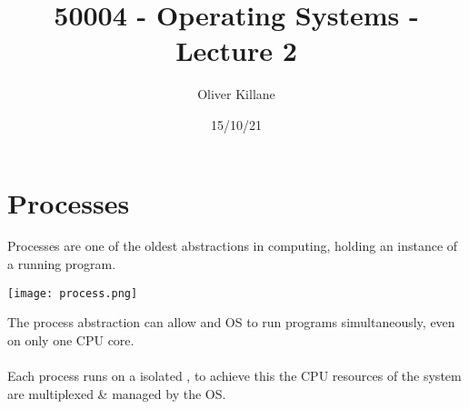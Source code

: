 \documentclass{report}
\title{50004 - Operating Systems - Lecture 2}
\author{Oliver Killane}
\date{15/10/21}
\begin{document}
    \maketitle

    \section*{Processes}
        Processes are one of the oldest abstractions in computing, holding an instance of a running program.
        \begin{center}
            \texttt{[image: process.png]}
        \end{center}
        The process abstraction can allow and OS to run programs simultaneously, even on only one CPU core.
        \\
        \\ Each process runs on a isolated , to achieve this the CPU resources of the system are multiplexed \& managed by the OS.
\end{document}
